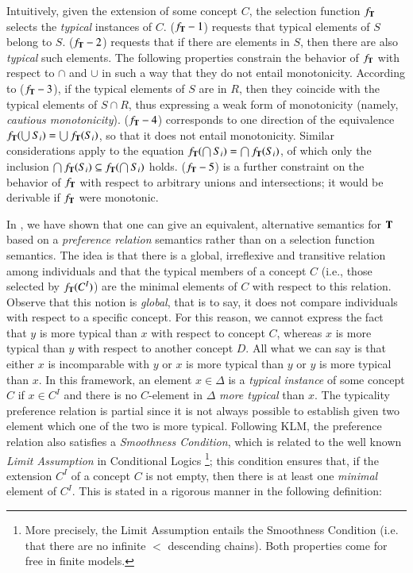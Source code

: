 \documentclass[a4paper, 11pt, oneside]{elsarticle}
\newcommand{\tip}{{\bf T}}
\newcommand {\incluso} {\subseteq}
\begin{document}
\noindent Intuitively, given the extension of some concept $C$,
the selection function $f_\tip$ selects  the {\em typical}
instances of $C$. ($f_\tip-1$) requests that typical elements of
$S$ belong to $S$. ($f_\tip-2$) requests that if there are
elements in $S$, then there are also {\em typical} such elements.
The following properties constrain the behavior of $f_\tip$ with
respect to $\cap$ and $\cup$ in such a way that they do not entail
monotonicity. According to ($f_\tip-3$), if the typical elements
of $S$ are in $R$, then they coincide with the typical elements of
$S \cap R$, thus expressing a weak form of monotonicity (namely,
{\em cautious monotonicity}). ($f_\tip-4$) corresponds to one
direction of the equivalence $f_\tip(\bigcup S_i) = \bigcup
f_\tip(S_i)$, so that it does not entail monotonicity. Similar
considerations apply to the equation $f_\tip(\bigcap S_i) =
\bigcap f_\tip(S_i)$, of which only the inclusion $\bigcap
f_\tip(S_i) \incluso f_\tip(\bigcap S_i)$ holds. ($f_\tip-5$) is a
further constraint on the behavior of $f_\tip$ with respect to
arbitrary unions and intersections; it would be derivable if
$f_\tip$ were monotonic.



In \cite{FI09}, we have shown that one can give an equivalent,
alternative semantics for $\tip$ based on a \emph{preference
relation} semantics rather than on a selection function semantics.
The idea is that there is a global, irreflexive and transitive
relation among individuals and that the typical members of a
concept $C$ (i.e., those selected by $f_\tip(C^I)$) are the
minimal elements of $C$ with respect to this relation. Observe
that this notion is \emph{global}, that is to say, it does not
compare individuals with respect to a specific concept. For this
reason,  we cannot express the fact that  $y$ is more typical than
$x$ with respect to concept $C$, whereas $x$ is more typical than
$y$ with respect to another concept $D$. All what we can say is
that either $x$ is incomparable with $y$ or $x$ is more typical
than $y$ or $y$ is more typical than $x$. In this framework, an
element $x \in \Delta$ is a {\em typical instance} of some concept
$C$ if $x \in C^I$ and there is no $C$-element in $\Delta$ {\em
more typical} than $x$. The typicality preference relation is
partial since it is not always possible to establish given two
element which one of the two is more typical. Following KLM, the
preference relation also satisfies a \emph{Smoothness Condition},
which is related to the well known \emph{Limit Assumption} in
Conditional Logics \cite{Nute80} \footnote{More precisely,
the Limit Assumption entails the Smoothness Condition (i.e. that
there are no infinite $<$ descending chains). Both properties come
for free in finite models.}; this condition ensures that, if the
extension $C^I$ of a concept $C$ is not empty, then there is at
least one \emph{minimal} element of $C^I$. This is stated in a
rigorous manner in the following definition:
\end{document}
